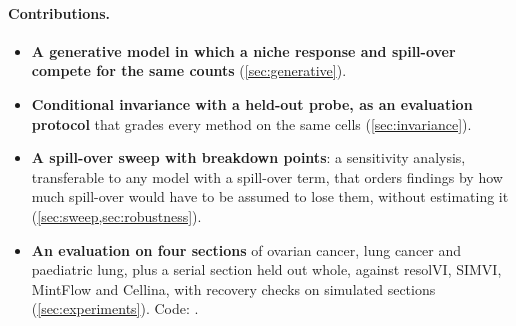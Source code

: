 \paragraph{Contributions.}
\begin{itemize}[leftmargin=*,itemsep=1pt,topsep=2pt]
\item \textbf{A generative model in which a niche response and spill-over compete for the same counts} (\cref{sec:generative}).
\item \textbf{Conditional invariance with a held-out probe, as an evaluation protocol} that grades every method on the same cells (\cref{sec:invariance}).
\item \textbf{A spill-over sweep with breakdown points}: a sensitivity analysis, transferable to any model with a spill-over term, that orders findings by how much spill-over would have to be assumed to lose them, without estimating it (\cref{sec:sweep,sec:robustness}).
\item \textbf{An evaluation on four sections} of ovarian cancer, lung cancer and paediatric lung, plus a serial section held out whole, against resolVI, SIMVI, MintFlow and Cellina, with recovery checks on simulated sections (\cref{sec:experiments}). Code: \codelink.
\end{itemize}
